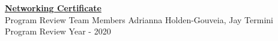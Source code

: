 
\underline{\textbf{Networking Certificate}}
\\
Program Review Team Members
Adrianna Holden-Gouveia, Jay Termini
\\
Program Review Year - 2020

